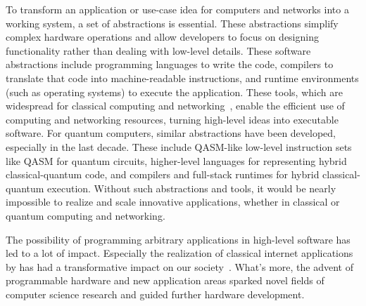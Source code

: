 To transform an application or use-case idea for computers and networks into a working system, a set of abstractions is essential.
These abstractions simplify complex hardware operations and allow developers to focus on designing functionality rather than dealing with low-level details.
These software abstractions include programming languages to write the code, compilers to translate that code into machine-readable instructions, and runtime environments (such as operating systems) to execute the application.
These tools, which are widespread for classical computing and networking~\cite{aho_compilers_2006, silberschatz_book_2014, james_computer_2016}, enable the efficient use of computing and networking resources, turning high-level ideas into executable software.
For quantum computers, similar abstractions have been developed, especially in the last decade.
These include QASM-like low-level instruction sets like QASM for quantum circuits, higher-level languages for representing hybrid classical-quantum code, and compilers and full-stack runtimes for hybrid classical-quantum execution.
Without such abstractions and tools, it would be nearly impossible to realize and scale innovative applications, whether in classical or quantum computing and networking.

The possibility of programming arbitrary applications in high-level software has led to a lot of impact.
Especially the realization of classical internet applications by has had a transformative impact on our society~\cite{castells_impact_2013}. What's more, the advent of programmable hardware and new application areas sparked novel fields of computer science research and guided further hardware development.







